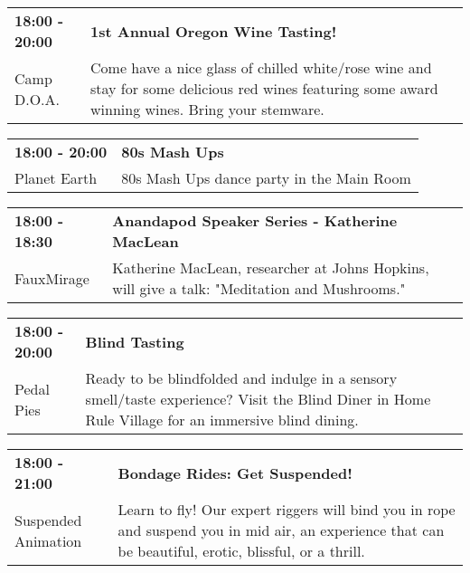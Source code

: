 \begin{tabular}{ p{1in} p{2.2in} }
    \textbf{18:00 - 20:00} & \textbf{1st Annual Oregon Wine Tasting!} \\
    Camp D.O.A. \newline  & Come have a nice glass of chilled white/rose wine and stay for some delicious red wines featuring some award winning wines. Bring your stemware. \\
    \hline 
\end{tabular}
    
\begin{tabular}{ p{1in} p{2.2in} }
    \textbf{18:00 - 20:00} & \textbf{80s Mash Ups} \\
    Planet Earth \newline  & 80s Mash Ups dance party in the Main Room \\
    \hline 
\end{tabular}
    
\begin{tabular}{ p{1in} p{2.2in} }
    \textbf{18:00 - 18:30} & \textbf{Anandapod Speaker Series - Katherine MacLean} \\
    FauxMirage \newline  & Katherine MacLean, researcher at Johns Hopkins, will give a talk: "Meditation and Mushrooms." \\
    \hline 
\end{tabular}
    
\begin{tabular}{ p{1in} p{2.2in} }
    \textbf{18:00 - 20:00} & \textbf{Blind Tasting} \\
    Pedal Pies \newline  & Ready to be blindfolded and indulge in a sensory smell/taste experience? Visit the Blind Diner in Home Rule Village for an immersive blind dining. \\
    \hline 
\end{tabular}
    
\begin{tabular}{ p{1in} p{2.2in} }
    \textbf{18:00 - 21:00} & \textbf{Bondage Rides: Get Suspended!} \\
    Suspended Animation \newline  & Learn to fly! Our expert riggers will bind you in rope and suspend you in mid air, an experience that can be beautiful, erotic, blissful, or a thrill. \\
    \hline 
\end{tabular}
    
